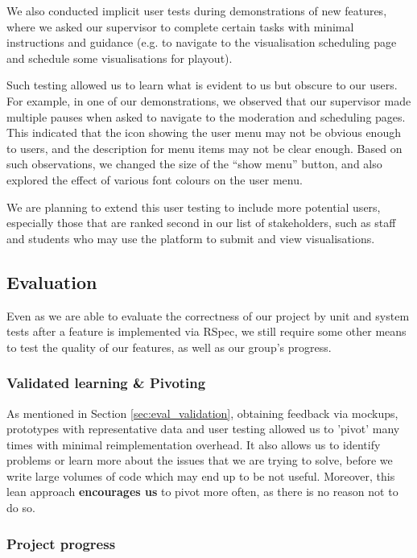 \documentclass[a4paper, titlepage]{article}
\begin{document}
We also conducted implicit user tests during demonstrations of new features, where we asked our supervisor to complete certain tasks with minimal instructions and guidance (e.g. to navigate to the visualisation scheduling page and schedule some visualisations for playout).

Such testing allowed us to learn what is evident to us but obscure to our users. For example, in one of our demonstrations, we observed that our supervisor made multiple pauses when asked to navigate to the moderation and scheduling pages. This indicated that the icon showing the user menu may not be obvious enough to users, and the description for menu items may not be clear enough. Based on such observations, we changed the size of the ``show menu'' button, and also explored the effect of various font colours on the user menu.

We are planning to extend this user testing to include more potential users, especially those that are ranked second in our list of stakeholders, such as staff and students who may use the platform to submit and 
view visualisations.

\subsection{Evaluation}

Even as we are able to evaluate the correctness of our project by unit and system tests after a feature is implemented via RSpec, we still require some other means to test the quality of our features, as well as our group's progress.

\subsubsection{Validated learning \& Pivoting}

As mentioned in Section \ref{sec:eval_validation}, obtaining feedback via mockups, prototypes with representative data and user testing allowed us to 'pivot' many times with minimal reimplementation overhead. It also allows us to identify problems or learn more about the issues that we are trying to solve, before we write large volumes of code which may end up to be not useful. Moreover, this lean approach \textbf{encourages us} to pivot more often, as there is no reason not to do so.

\subsubsection{Project progress}
	
\end{document}
